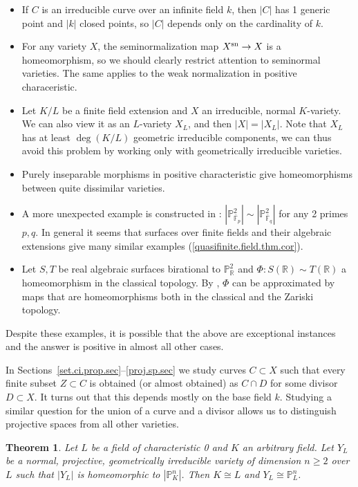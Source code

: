 \documentclass{amsart}
\newtheorem{thm}{Theorem}%
\theoremstyle{definition}
\theoremstyle{remark}
\renewcommand{\r}[0]{{\mathbb R}}
\newcommand{\p}[0]{{\mathbb P}}
\newcommand{\f}[0]{{\mathbb F}}
\begin{document}
\begin{itemize}
\item  If $C$ is an irreducible curve over an infinite field $k$,
then $|C|$ has 1 generic point and $|k|$ closed points, so $|C|$ depends only on the cardinality of $k$. 
\item For any variety $X$, the seminormalization  map $X^{\rm sn}\to X$
is a homeomorphism, so we should clearly restrict attention to
seminormal varieties. 
The same applies to the weak normalization in positive characeristic.
\item Let $K/L$ be a finite field extension and $X$ an irreducible,  normal $K$-variety. We can also view it  as an $L$-variety  $X_L$, and then $|X|=|X_L|$. Note that  $X_L$ has at least $\deg (K/L)$ geometric irreducible components, we can thus avoid this problem by working only with  geometrically irreducible varieties.
\item   Purely inseparable morphisms in positive characteristic
give homeomorphisms between quite dissimilar varieties. 
\item A more unexpected example is constructed  in \cite{MR624904}:  $|\p^2_{\bar\f_p}|\sim |\p^2_{\bar\f_q}|$
for any 2 primes $p, q$. In general it seems that  surfaces over finite fields and their algebraic extensions give many similar examples (\ref{quasifinite.field.thm.cor}).
\item   Let $S, T$ be real algebraic surfaces birational to $\p^2_{\r}$
and $\Phi:S(\r)\sim T(\r)$ a homeomorphism  in the classical topology.
By \cite{k-mang},  $\Phi$  can be approximated by maps that are homeomorphisms  
both in the classical and the Zariski topology.
\end{itemize}

Despite these examples, it is  possible that the above are exceptional  instances and the answer is positive in almost all other cases.




In Sections~\ref{set.ci.prop.sec}--\ref{proj.sp.sec} 
we study curves $C\subset X$ such that every  finite subset
$Z\subset C$ is obtained (or almost obtained) as $C\cap D$ for some divisor $D\subset X$. 
It turns out that this depends mostly on the base field $k$.
Studying a similar question for the union of a curve and a divisor
  allows us to distinguish
projective spaces from all other varieties.


\begin{thm}\label{planes.in.Pn.thm.2.intro}
Let $L$ be a  field  of characteristic 0 and  $K$    an arbitrary  field.
Let $Y_L$ be a normal, projective, geometrically irreducible  variety of dimension $n\geq 2$ over  $L$  such that $|Y_L|$  is homeomorphic to
 $|\p^n_K|$.    Then   $K\cong L$ and 
 $Y_L\cong \p^n_L$.
\end{thm}
\end{document}
